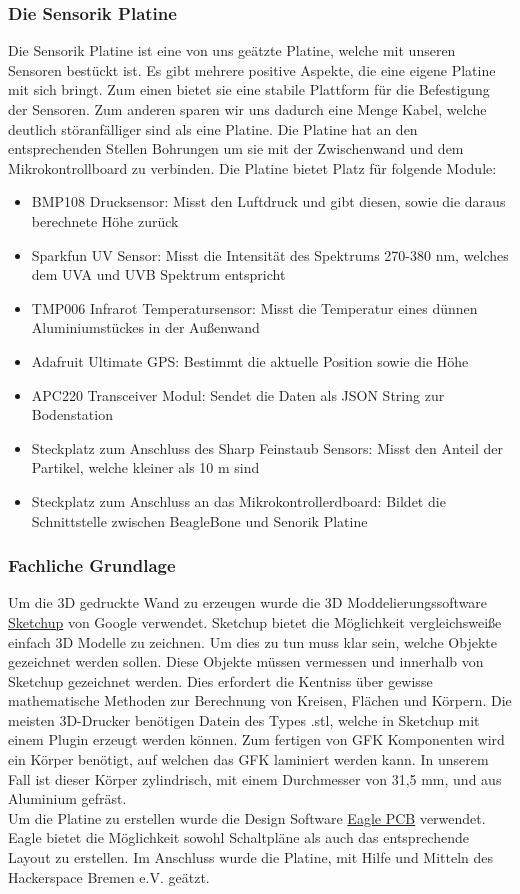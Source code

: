 \subsubsection{Die Sensorik Platine}
Die Sensorik Platine ist eine von uns geätzte Platine, welche mit unseren Sensoren bestückt ist. Es gibt mehrere positive Aspekte, die eine eigene Platine mit sich bringt. Zum einen bietet sie eine stabile Plattform für die Befestigung der Sensoren. Zum anderen sparen wir uns dadurch eine Menge Kabel, welche deutlich störanfälliger sind als eine Platine. Die Platine hat an den entsprechenden Stellen Bohrungen um sie mit der Zwischenwand und dem Mikrokontrollboard zu verbinden. Die Platine bietet Platz für folgende Module:

\begin{itemize}
	\item BMP108 Drucksensor: Misst den Luftdruck und gibt diesen, sowie die daraus berechnete Höhe zurück
	\item Sparkfun UV Sensor: Misst die Intensität des Spektrums 270-380 nm, welches dem UVA und UVB Spektrum entspricht
	\item TMP006 Infrarot Temperatursensor: Misst die Temperatur eines dünnen Aluminiumstückes in der Außenwand 
	\item Adafruit Ultimate GPS: Bestimmt die aktuelle Position sowie die Höhe
	\item APC220 Transceiver Modul: Sendet die Daten als JSON String zur Bodenstation
	\item Steckplatz zum Anschluss des Sharp Feinstaub Sensors: Misst den Anteil der Partikel, welche kleiner als 10 \textmu m sind
	\item Steckplatz zum Anschluss an das Mikrokontrollerdboard: Bildet die Schnittstelle zwischen BeagleBone und Senorik Platine
\end{itemize}

\subsubsection {Fachliche Grundlage}
Um die 3D gedruckte Wand zu erzeugen wurde die 3D Moddelierungssoftware \href{http://www.sketchup.com/de} {Sketchup} von Google verwendet. Sketchup bietet die Möglichkeit vergleichsweiße einfach 3D Modelle zu zeichnen. Um dies zu tun muss klar sein, welche Objekte gezeichnet werden sollen. Diese Objekte müssen vermessen und innerhalb von Sketchup gezeichnet werden. Dies erfordert die Kentniss über gewisse mathematische Methoden zur Berechnung von Kreisen, Flächen und Körpern. Die meisten 3D-Drucker benötigen Datein des Types .stl, welche in Sketchup mit einem Plugin erzeugt werden können.
Zum fertigen von GFK Komponenten wird ein Körper benötigt, auf welchen das GFK laminiert werden kann. In unserem Fall ist dieser Körper zylindrisch, mit einem Durchmesser von 31,5 mm, und aus Aluminium gefräst. \\
Um die Platine zu erstellen wurde die Design Software \href{http://www.cadsoft.de/eagle-pcb-design-software/} {Eagle PCB} verwendet. Eagle bietet die Möglichkeit sowohl Schaltpläne als auch das entsprechende Layout zu erstellen. Im Anschluss wurde die Platine, mit Hilfe und Mitteln des Hackerspace Bremen e.V. geätzt.

